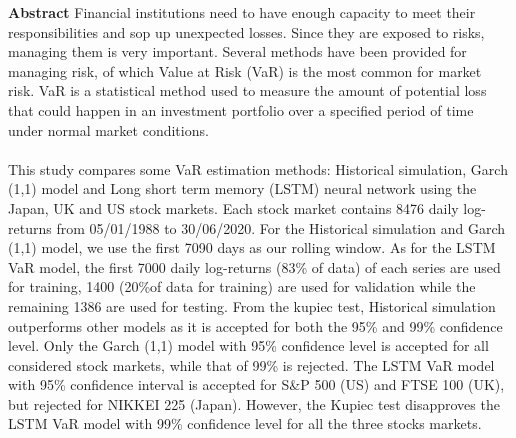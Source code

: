 \begin{titlepage}
	\textbf{\LARGE Abstract}\newline\newline
Financial institutions need to have enough capacity to meet their responsibilities and sop up unexpected losses. Since they are exposed to risks, managing them is very important. Several methods have been provided for managing risk, of which Value at Risk (VaR) is the most common for market risk. VaR is a statistical method used to measure the amount of potential loss that could happen in an investment portfolio over a specified period of time under normal market conditions.\\\\ This study compares some VaR estimation methods: Historical simulation, Garch (1,1) model and Long short term memory (LSTM) neural network using the Japan, UK and US stock markets. Each stock market contains 8476 daily log-returns from 05/01/1988 to 30/06/2020. For the Historical simulation and Garch (1,1) model, we use the first 7090 days as our rolling window. As for the LSTM VaR model, the first 7000 daily log-returns (83\% of data) of each series are used for training, 1400 (20\%of data for training) are used for validation while the remaining 1386 are used for testing. From the kupiec test, Historical simulation outperforms other models as it is accepted for both the 95\% and 99\% confidence level. Only the Garch (1,1) model with 95\% confidence level is accepted for all considered stock markets, while that of 99\% is rejected. The LSTM VaR model with 95\% confidence interval is accepted for S\&P 500 (US) and  FTSE 100 (UK), but rejected for NIKKEI 225 (Japan). However, the Kupiec test disapproves the LSTM VaR model with 99\% confidence level for all the three stocks markets.


\end{titlepage}
\thispagestyle{empty}

\newpage\null\thispagestyle{empty}\newpage

